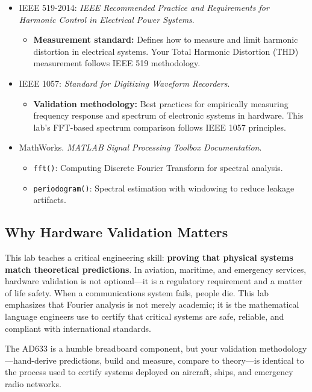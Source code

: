 \documentclass[11pt,letterpaper]{article}
\begin{document}
\begin{itemize}
    \item IEEE 519-2014: \textit{IEEE Recommended Practice and Requirements for Harmonic Control in Electrical Power Systems}.
    \begin{itemize}
        \item \textbf{Measurement standard:} Defines how to measure and limit harmonic distortion in electrical systems. Your Total Harmonic Distortion (THD) measurement follows IEEE 519 methodology.
    \end{itemize}

    \item IEEE 1057: \textit{Standard for Digitizing Waveform Recorders}.
    \begin{itemize}
        \item \textbf{Validation methodology:} Best practices for empirically measuring frequency response and spectrum of electronic systems in hardware. This lab's FFT-based spectrum comparison follows IEEE 1057 principles.
    \end{itemize}

    \item MathWorks. \textit{MATLAB Signal Processing Toolbox Documentation}.
    \begin{itemize}
        \item \texttt{fft()}: Computing Discrete Fourier Transform for spectral analysis.
        \item \texttt{periodogram()}: Spectral estimation with windowing to reduce leakage artifacts.
    \end{itemize}
\end{itemize}

\subsection*{Why Hardware Validation Matters}

This lab teaches a critical engineering skill: \textbf{proving that physical systems match theoretical predictions}. In aviation, maritime, and emergency services, hardware validation is not optional—it is a regulatory requirement and a matter of life safety. When a communications system fails, people die. This lab emphasizes that Fourier analysis is not merely academic; it is the mathematical language engineers use to certify that critical systems are safe, reliable, and compliant with international standards.

The AD633 is a humble breadboard component, but your validation methodology—hand-derive predictions, build and measure, compare to theory—is identical to the process used to certify systems deployed on aircraft, ships, and emergency radio networks.
\end{document}
